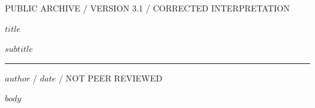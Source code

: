 \documentclass[9pt]{extarticle}
\begin{document}
{\small\ttfamily PUBLIC ARCHIVE / VERSION 3.1 / CORRECTED INTERPRETATION}\par\vspace{0.65em}
{\Huge\bfseries $title$}\par\vspace{0.35em}
{\Large $subtitle$}\par\vspace{0.65em}
\textcolor{signal}{\rule{30pt}{4pt}}\par\vspace{0.65em}
{\small $author$ / $date$ / NOT PEER REVIEWED}\par\vspace{0.8em}
$body$
\end{document}
